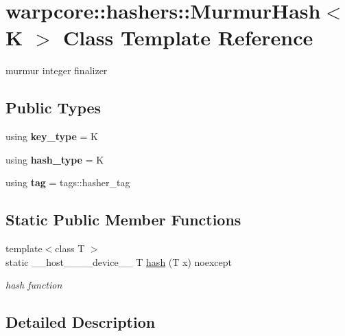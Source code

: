 \hypertarget{classwarpcore_1_1hashers_1_1MurmurHash}{}\section{warpcore\+:\+:hashers\+:\+:Murmur\+Hash$<$ K $>$ Class Template Reference}
\label{classwarpcore_1_1hashers_1_1MurmurHash}


murmur integer finalizer  


\subsection*{Public Types}
\begin{DoxyCompactItemize}
\item 
\mbox{\label{classwarpcore_1_1hashers_1_1MurmurHash_a5ef1db33365a012c05d3f1684d61d701}} 
using {\bfseries key\+\_\+type} = K
\item 
\mbox{\label{classwarpcore_1_1hashers_1_1MurmurHash_a158929bb0d2e8621bf365d638e3e9339}} 
using {\bfseries hash\+\_\+type} = K
\item 
\mbox{\label{classwarpcore_1_1hashers_1_1MurmurHash_a6000ee6d246c5de30ede7cf55e43c072}} 
using {\bfseries tag} = tags\+::hasher\+\_\+tag
\end{DoxyCompactItemize}
\subsection*{Static Public Member Functions}
\begin{DoxyCompactItemize}
\item 
{\footnotesize template$<$class T $>$ }\\static \+\_\+\+\_\+host\+\_\+\+\_\+\+\_\+\+\_\+device\+\_\+\+\_\+ T \hyperlink{classwarpcore_1_1hashers_1_1MurmurHash_aa54d11b7c827b9d62c77dda71e505047}{hash} (T x) noexcept
\begin{DoxyCompactList}\small\item\em hash function \end{DoxyCompactList}\end{DoxyCompactItemize}


\subsection{Detailed Description}
